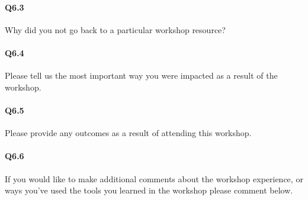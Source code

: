\documentclass[030-workshop.tex]{subfiles}
\begin{document}
    \paragraph{Q6.3}

        Why did you not go back to a particular workshop resource?

    \paragraph{Q6.4}

        Please tell us the most important way you were impacted as a result of the workshop.

    \paragraph{Q6.5}

        Please provide any outcomes as a result of attending this workshop.

    \paragraph{Q6.6}

        If you would like to make additional comments about the workshop experience,
        or ways you've used the tools you learned in the workshop please comment
        below.
\end{document}
